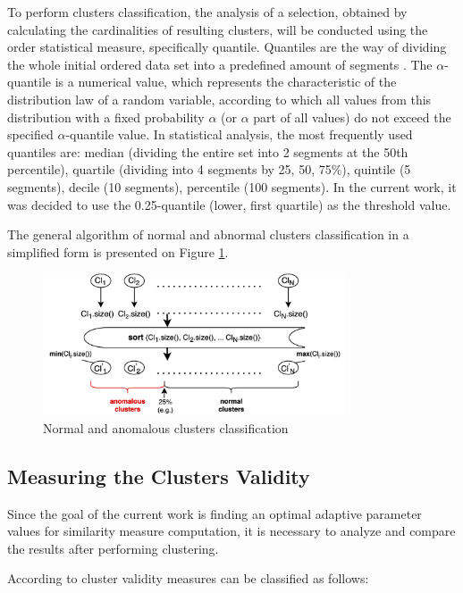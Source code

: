 To perform clusters classification, the analysis of a selection, obtained by calculating the cardinalities of resulting clusters, will be conducted using the order statistical measure, specifically quantile. Quantiles are the way of dividing the whole initial ordered data set into a predefined amount of segments \cite{inbook:stats}. The $\alpha$-quantile is a numerical value, which represents the characteristic of the distribution law of a random variable, according to which all values from this distribution with a fixed probability $\alpha$ (or $\alpha$ part of all values) do not exceed the specified $\alpha$-quantile value. In statistical analysis, the most frequently used quantiles are: median (dividing the entire set into 2 segments at the 50th percentile), quartile (dividing into 4 segments by 25, 50, 75\%), quintile (5 segments), decile (10 segments), percentile (100 segments). In the current work, it was decided to use the 0.25-quantile (lower, first quartile) as the threshold value.

The general algorithm of normal and abnormal clusters classification in a simplified form is presented on Figure \ref{fig:cl-classif}.

\begin{figure}[!htb]
	\centering{}
	\includegraphics[width=0.8\textwidth]{images/cl-classif.png}
	\caption{Normal and anomalous clusters classification}
	\label{fig:cl-classif}
\end{figure}

\subsection{Measuring the Clusters Validity}

Since the goal of the current work is finding an optimal adaptive parameter values for similarity measure computation, it is necessary to analyze and compare the results after performing clustering. 

According to \cite{online:dunn_cl_valid} cluster validity measures can be classified as follows:

